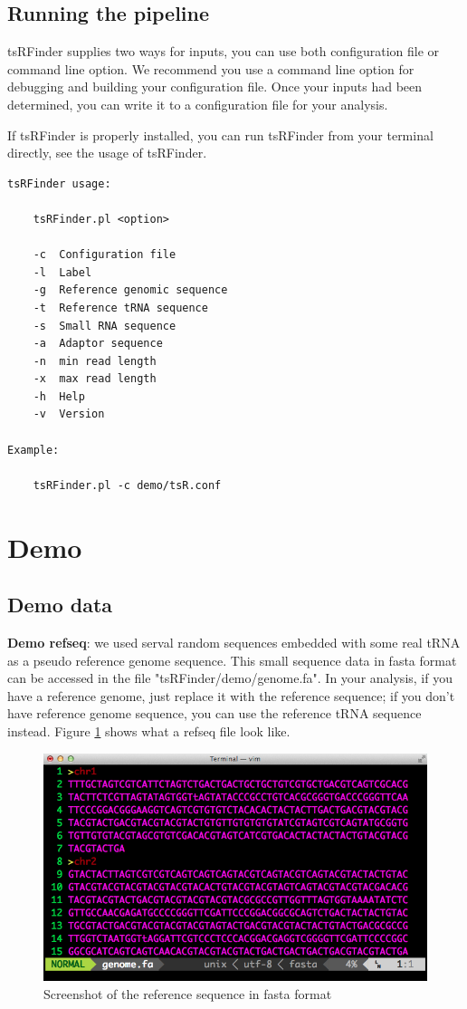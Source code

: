 \documentclass[11pt, a4paper]{article}
\begin{document}
\subsection{Running the pipeline}

tsRFinder supplies two ways for inputs, you can use both configuration file or command line option. We recommend you use a command line option for debugging and building your configuration file. Once your inputs had been determined, you can write it to a configuration file for your analysis.

If tsRFinder is properly installed, you can run tsRFinder from your terminal directly, see the usage of tsRFinder.

{\small \begin{verbatim}
tsRFinder usage:

    tsRFinder.pl <option>

    -c  Configuration file
    -l  Label
    -g  Reference genomic sequence
    -t  Reference tRNA sequence
    -s  Small RNA sequence
    -a  Adaptor sequence
    -n  min read length
    -x  max read length
    -h  Help
    -v  Version

Example:

    tsRFinder.pl -c demo/tsR.conf
\end{verbatim}}

\section{Demo}

\subsection{Demo data}

\textbf{Demo refseq}: we used serval random sequences embedded with some real tRNA as a pseudo reference genome sequence. This small sequence data in fasta format can be accessed in the file "tsRFinder/demo/genome.fa". In your analysis, if you have a reference genome, just replace it with the reference sequence; if you don't have reference genome sequence, you can use the reference tRNA sequence instead. Figure \ref{refseq} shows what a refseq file look like.

\begin{figure}[htbp]
\begin{center}
\includegraphics[width=12cm]{refseq.png}
\caption{Screenshot of the reference sequence in fasta format} 
\label{refseq}
\end{center}
\end{figure}
\end{document}
